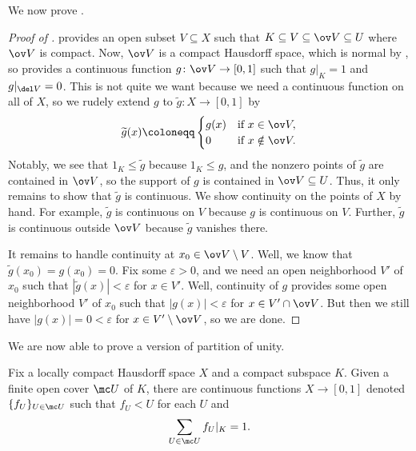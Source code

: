 \documentclass[../notes.tex]{subfiles}
\begin{document}
We now prove .
\begin{proof}[Proof of ]
	 provides an open subset $V\subseteq X$ such that $K\subseteq V\subseteq\ov V\subseteq U$ where $\ov V$ is compact. Now, $\ov V$ is a compact Hausdorff space, which is normal by , so  provides a continuous function $g\colon\ov V\to[0,1]$ such that $g|_K=1$ and $g|_{\del V}=0$. This is not quite we want because we need a continuous function on all of $X$, so we rudely extend $g$ to $\widetilde g\colon X\to[0,1]$ by
	\[\widetilde g(x)\coloneqq\begin{cases}
		g(x) & \text{if }x\in\ov V, \\
		0 & \text{if }x\notin\ov V.
	\end{cases}\]
	Notably, we see that $1_K\le\widetilde g$ because $1_K\le g$, and the nonzero points of $\widetilde g$ are contained in $\ov V$, so the support of $g$ is contained in $\ov V\subseteq U$. Thus, it only remains to show that $\widetilde g$ is continuous. We show continuity on the points of $X$ by hand. For example, $\widetilde g$ is continuous on $V$ because $g$ is continuous on $V$. Further, $\widetilde g$ is continuous outside $\ov V$ because $\widetilde g$ vanishes there.

	It remains to handle continuity at $x_0\in\ov V\setminus V$. Well, we know that $\widetilde g(x_0)=g(x_0)=0$. Fix some $\varepsilon>0$, and we need an open neighborhood $V'$ of $x_0$ such that $\left|\widetilde g(x)\right|<\varepsilon$ for $x\in V'$. Well, continuity of $g$ provides some open neighborhood $V'$ of $x_0$ such that $\left|g(x)\right|<\varepsilon$ for $x\in V'\cap\ov V$. But then we still have $\left|g(x)\right|=0<\varepsilon$ for $x\in V'\setminus\ov V$, so we are done.
\end{proof}
We are now able to prove a version of partition of unity.
\begin{theorem}
	Fix a locally compact Hausdorff space $X$ and a compact subspace $K$. Given a finite open cover $\mc U$ of $K$, there are continuous functions $X\to[0,1]$ denoted $\{f_U\}_{U\in\mc U}$ such that $f_U<U$ for each $U$ and
	\[\sum_{U\in\mc U}f_U|_K=1.\]
\end{theorem}
\end{document}
